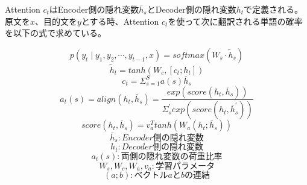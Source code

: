 \documentclass[dvipdfmx,12pt,report]{jsbook}
\begin{document}
Attention $c_t$はEncoder側の隠れ変数$\bar{h}_s$とDecoder側の隠れ変数$h_t$で定義される。
原文を$x$、目的文を$y$とする時、Attention $c_t$を使って次に翻訳される単語の確率を以下の式で求めている。

$$p(y_t\mid y_1, y_2, \cdots, y_{t-1}, x)=softmax(W_s\cdot \tilde{h}_s)$$
$$\tilde{h}_t=tanh(W_c,[c_t;h_t])$$
$$c_t=\Sigma_{s=1}^S a(s)\bar{h}_s$$
$$a_t(s)=align(h_t,\bar{h}_s)=\frac{exp(score(h_t,\bar{h}_s))}{\Sigma_s^{'} exp(score(h_t,\bar{h}_s^{'}))}$$
$$score(h_t,\bar{h}_s)=v_a^T tanh(W_a(h_t;\bar{h}_s))$$
$$\bar{h}_s : Encoder側の隠れ変数$$
$$h_t : Decoder側の隠れ変数$$
$$a_t(s) : 両側の隠れ変数の荷重比率$$
$$W_s,W_c,W_a,v_a : 学習パラメータ$$
$$(a;b) : ベクトルaとbの連結$$



% 
% 



\end{document}
